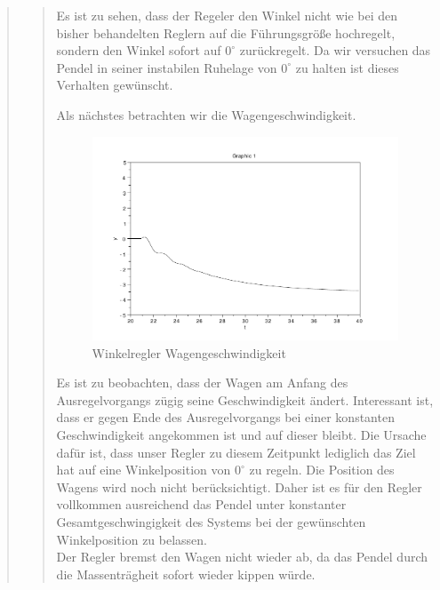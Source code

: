 \begin{quote}
\begin{quote}
        Es ist zu sehen, dass der Regeler den Winkel nicht wie bei den bisher behandelten Reglern auf die Führungsgröße
        hochregelt, sondern den Winkel sofort auf $0^{\circ}$ zurückregelt. Da wir versuchen das Pendel in seiner
        instabilen Ruhelage von $0^{\circ}$ zu halten ist dieses Verhalten gewünscht.\vspace{1em}
        
        Als nächstes betrachten wir die Wagengeschwindigkeit.
        
        \begin{figure}[H]
        \centering
            \includegraphics[scale=0.7, trim = 0cm 0cm 0cm 0cm, clip]{./Bilder/Winkelregler_Wagengeschwindigkeit}
                \caption{Winkelregler Wagengeschwindigkeit}
        \end{figure}
        
        Es ist zu beobachten, dass der Wagen am Anfang des Ausregelvorgangs zügig seine Geschwindigkeit ändert. Interessant
        ist, dass er gegen Ende des Ausregelvorgangs bei einer konstanten Geschwindigkeit angekommen ist und auf dieser
        bleibt. Die Ursache dafür ist, dass unser Regler zu diesem Zeitpunkt lediglich das Ziel hat auf eine
        Winkelposition von $0^{\circ}$ zu regeln. Die Position des Wagens wird noch nicht berücksichtigt. Daher ist es
        für den Regler vollkommen ausreichend das Pendel unter konstanter Gesamtgeschwingigkeit des Systems bei der
        gewünschten Winkelposition zu belassen.\\
        Der Regler bremst den Wagen nicht wieder ab, da das Pendel durch die Massenträgheit sofort wieder kippen würde.
        \vspace{1em}
        

\end{quote}
\end{quote}
